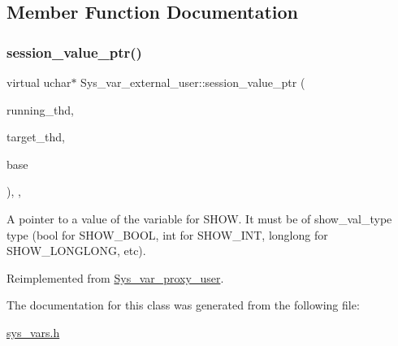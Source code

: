 \subsection{Member Function Documentation}
\mbox{\label{classSys__var__external__user_ac6b27bbbb43cea6353281663397f9b8c}} 
\subsubsection{\texorpdfstring{session\+\_\+value\+\_\+ptr()}{session\_value\_ptr()}}
{\footnotesize\ttfamily virtual uchar$\ast$ Sys\+\_\+var\+\_\+external\+\_\+user\+::session\+\_\+value\+\_\+ptr (\begin{DoxyParamCaption}\item[{T\+HD $\ast$}]{running\+\_\+thd,  }\item[{T\+HD $\ast$}]{target\+\_\+thd,  }\item[{L\+E\+X\+\_\+\+S\+T\+R\+I\+NG $\ast$}]{base }\end{DoxyParamCaption})\hspace{0.3cm}{\ttfamily [inline]}, {\ttfamily [protected]}, {\ttfamily [virtual]}}

A pointer to a value of the variable for S\+H\+OW. It must be of show\+\_\+val\+\_\+type type (bool for S\+H\+O\+W\+\_\+\+B\+O\+OL, int for S\+H\+O\+W\+\_\+\+I\+NT, longlong for S\+H\+O\+W\+\_\+\+L\+O\+N\+G\+L\+O\+NG, etc). 

Reimplemented from \mbox{\hyperlink{classSys__var__proxy__user_adb78f56144c8f7fd06d74c41777657d5}{Sys\+\_\+var\+\_\+proxy\+\_\+user}}.



The documentation for this class was generated from the following file\+:\begin{DoxyCompactItemize}
\item 
\mbox{\hyperlink{sys__vars_8h}{sys\+\_\+vars.\+h}}\end{DoxyCompactItemize}
